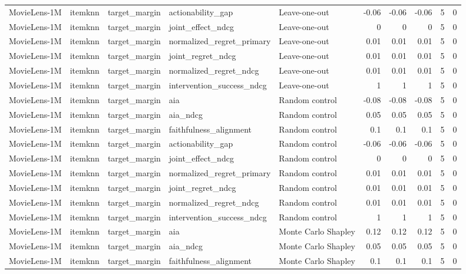 \begin{table}[t]
{\begin{tabular}{lllllrrrrr}
MovieLens-1M & itemknn & target\_margin & actionability\_gap & Leave-one-out & -0.06 & -0.06 & -0.06 & 5 & 0 \\
MovieLens-1M & itemknn & target\_margin & joint\_effect\_ndcg & Leave-one-out & 0 & 0 & 0 & 5 & 0 \\
MovieLens-1M & itemknn & target\_margin & normalized\_regret\_primary & Leave-one-out & 0.01 & 0.01 & 0.01 & 5 & 0 \\
MovieLens-1M & itemknn & target\_margin & joint\_regret\_ndcg & Leave-one-out & 0.01 & 0.01 & 0.01 & 5 & 0 \\
MovieLens-1M & itemknn & target\_margin & normalized\_regret\_ndcg & Leave-one-out & 0.01 & 0.01 & 0.01 & 5 & 0 \\
MovieLens-1M & itemknn & target\_margin & intervention\_success\_ndcg & Leave-one-out & 1 & 1 & 1 & 5 & 0 \\
MovieLens-1M & itemknn & target\_margin & aia & Random control & -0.08 & -0.08 & -0.08 & 5 & 0 \\
MovieLens-1M & itemknn & target\_margin & aia\_ndcg & Random control & 0.05 & 0.05 & 0.05 & 5 & 0 \\
MovieLens-1M & itemknn & target\_margin & faithfulness\_alignment & Random control & 0.1 & 0.1 & 0.1 & 5 & 0 \\
MovieLens-1M & itemknn & target\_margin & actionability\_gap & Random control & -0.06 & -0.06 & -0.06 & 5 & 0 \\
MovieLens-1M & itemknn & target\_margin & joint\_effect\_ndcg & Random control & 0 & 0 & 0 & 5 & 0 \\
MovieLens-1M & itemknn & target\_margin & normalized\_regret\_primary & Random control & 0.01 & 0.01 & 0.01 & 5 & 0 \\
MovieLens-1M & itemknn & target\_margin & joint\_regret\_ndcg & Random control & 0.01 & 0.01 & 0.01 & 5 & 0 \\
MovieLens-1M & itemknn & target\_margin & normalized\_regret\_ndcg & Random control & 0.01 & 0.01 & 0.01 & 5 & 0 \\
MovieLens-1M & itemknn & target\_margin & intervention\_success\_ndcg & Random control & 1 & 1 & 1 & 5 & 0 \\
MovieLens-1M & itemknn & target\_margin & aia & Monte Carlo Shapley & 0.12 & 0.12 & 0.12 & 5 & 0 \\
MovieLens-1M & itemknn & target\_margin & aia\_ndcg & Monte Carlo Shapley & 0.05 & 0.05 & 0.05 & 5 & 0 \\
MovieLens-1M & itemknn & target\_margin & faithfulness\_alignment & Monte Carlo Shapley & 0.1 & 0.1 & 0.1 & 5 & 0 \\

\end{tabular}}
\end{table}
